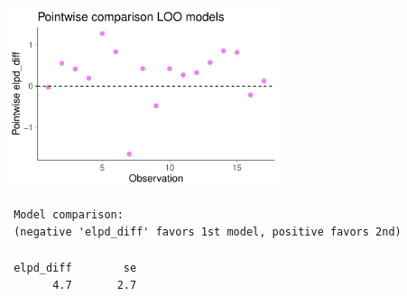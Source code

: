 \documentclass[10pt]{beamer}
\begin{document}
\begin{frame}

   \\

\end{frame}

\begin{frame}[fragile]

   {\includegraphics[width=8cm]{figs/milkelpddiff.pdf}}
   \\
   {\scriptsize
 \begin{lstlisting}
 Model comparison:
 (negative 'elpd_diff' favors 1st model, positive favors 2nd)

 elpd_diff        se
       4.7       2.7
 \end{lstlisting}}

 \end{frame}
\end{document}
